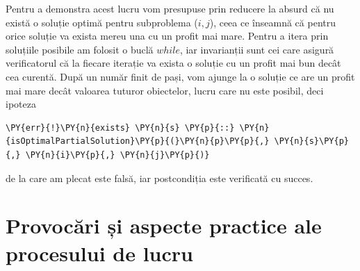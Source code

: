 \begin{sloppypar}
\begin{enumerate}
    \hspace{2mm} Pentru a demonstra acest lucru vom presupuse prin reducere la absurd că nu există o soluție optimă pentru subproblema ($i, j$), ceea ce  înseamnă că pentru orice soluție va exista mereu una cu un profit mai mare. Pentru a itera prin soluțiile posibile am folosit o buclă $while$, iar invarianții sunt cei care asigură verificatorul că la fiecare iterație va exista o soluție cu un profit mai bun decât cea curentă. După un număr finit de pași, vom ajunge la o soluție ce are un profit mai mare decât valoarea tuturor obiectelor, lucru care nu este posibil, deci ipoteza
    \begin{Verbatim}[commandchars=\\\{\}]
\PY{err}{!}\PY{n}{exists} \PY{n}{s} \PY{p}{::} \PY{n}{isOptimalPartialSolution}\PY{p}{(}\PY{n}{p}\PY{p}{,} \PY{n}{s}\PY{p}{,} \PY{n}{i}\PY{p}{,} \PY{n}{j}\PY{p}{)}
\end{Verbatim}
    de la care am plecat este falsă, iar postcondiția este verificată cu succes.
\end{enumerate}

\section{Provocări și aspecte practice ale procesului de lucru}


\end{sloppypar}
